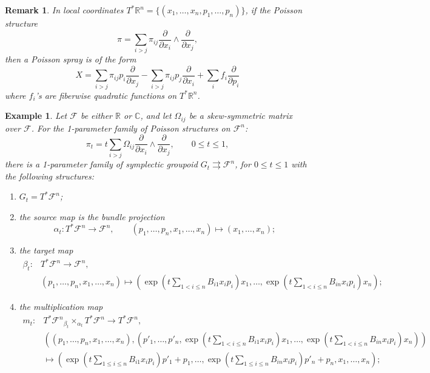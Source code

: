 \documentclass{amsart}
\newtheorem{remark}[theorem]{Remark}
\newtheorem{example}[theorem]{Example}
\newcommand{\cF}{\mathcal{F}}
\newcommand{\CC}{\mathbb{C}}
\newcommand{\RR}{\mathbb{R}}
\newcommand{\rra}{\rightrightarrows}
\begin{document}
\begin{remark} \label{remark:PoiSpLoc}
In local coordinates $T^*\mathbb{R}^n = \{(x_1, \ldots, x_n, p_1, \ldots, p_n)\}$, if the Poisson structure
$$
	\pi = \sum_{i > j} \pi_{ij} \frac{\partial}{\partial x_i} \wedge \frac{\partial}{\partial x_j},
$$
then a Poisson spray is of the form
$$
	X = \sum_{i > j} \pi_{ij} p_i \frac{\partial}{\partial x_j} - \sum_{i > j} \pi_{ij} p_j \frac{\partial}{\partial x_i} + \sum_i f_i \frac{\partial}{\partial p_i}
$$
where $f_i$'s are fiberwise quadratic functions on $T^*\mathbb{R}^n$.
\end{remark}

\begin{example} \label{ex:PoiSpLogC}
Let $\cF$ be either $\RR$ or $\CC$, and let $\Omega_{ij}$ be a skew-symmetric matrix over $\cF$. For the 1-parameter family of Poisson structures on $\cF^n$:
$$
	\pi_t = t\sum_{i > j} \Omega_{ij} \frac{\partial}{\partial x_i} \wedge \frac{\partial}{\partial x_j}, \qquad 0\leq t \leq 1,
$$
there is a 1-parameter family of symplectic groupoid $G_t \rra \cF^n$, for $0 \leq t \leq 1$ with the following structures:
	\begin{enumerate}
		\item $G_t = T^*\cF^n$;
		\item the source map is the bundle projection
			$$
				\alpha_t: T^*\cF^n \to \cF^n, \qquad (p_1, \ldots, p_n, x_1, \ldots, x_n) \mapsto (x_1, \ldots, x_n);
			$$
		\item the target map
			$$
				\begin{aligned}
				\beta_t: & T^*\cF^n \to \cF^n, \\
				& (p_1, \ldots, p_n, x_1, \ldots, x_n) \mapsto \left(\exp\left(t\sum\limits_{1 < i \leq n} B_{i1} x_ip_i \right)x_1, \ldots, \exp\left(t\sum\limits_{1 < i \leq n} B_{in} x_ip_i \right)x_n\right);
				\end{aligned}
			$$
		\item the multiplication map
			$$
				\begin{aligned}
				m_t: & T^*\cF^n {_{\beta_t}\times_{\alpha_t}} T^*\cF^n \to T^*\cF^n, \\
				& \left(\left(p_1, \ldots, p_n, x_1, \ldots, x_n\right), \left(p'_1, \ldots, p'_n, \exp\left(t\sum\limits_{1 < i \leq n} B_{i1} x_ip_i \right)x_1, \ldots, \exp\left(t\sum\limits_{1 < i \leq n} B_{in} x_ip_i \right)x_n\right)\right) \\
				& \mapsto \left(\exp\left(t \sum\limits_{1\leq i\leq n}B_{i1}x_i p_i\right) p'_1 + p_1, \ldots, \exp\left(t \sum\limits_{1\leq i\leq n}B_{in}x_i p_i\right) p'_n + p_n, x_1, \ldots, x_n \right);

\end{aligned}$$
\end{enumerate}
\end{example}
\end{document}
